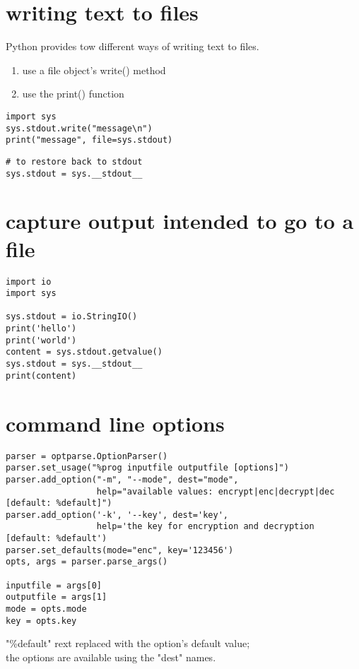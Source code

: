 \documentclass[11pt]{article}
\begin{document}
\section{writing text to files}
\label{sec-29}
Python provides tow different ways of writing text to files. \\
\begin{enumerate}
\item use a file object's write() method \\
\item use the print() function \\
\end{enumerate}
\begin{verbatim}
import sys
sys.stdout.write("message\n")
print("message", file=sys.stdout)
\end{verbatim}

\begin{verbatim}
# to restore back to stdout
sys.stdout = sys.__stdout__
\end{verbatim}
\section{capture output intended to go to a file}
\label{sec-30}
\begin{verbatim}
import io
import sys

sys.stdout = io.StringIO()
print('hello')
print('world')
content = sys.stdout.getvalue()
sys.stdout = sys.__stdout__
print(content)
\end{verbatim}

\section{command line options}
\label{sec-31}
\begin{verbatim}
parser = optparse.OptionParser()
parser.set_usage("%prog inputfile outputfile [options]")
parser.add_option("-m", "--mode", dest="mode",
                  help="available values: encrypt|enc|decrypt|dec [default: %default]")
parser.add_option('-k', '--key', dest='key',
                  help='the key for encryption and decryption [default: %default')
parser.set_defaults(mode="enc", key='123456')
opts, args = parser.parse_args()

inputfile = args[0]
outputfile = args[1]
mode = opts.mode
key = opts.key
\end{verbatim}

"\%default" rext replaced with the option's default value; \\
the options are available using the "dest" names. \\
\end{document}
